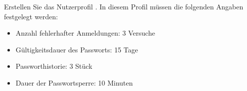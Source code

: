     \item Erstellen Sie das Nutzerprofil . In diesem Profil m\"ussen die folgenden Angaben festgelegt werden:
      \begin{itemize}
        \item Anzahl fehlerhafter Anmeldungen: 3 Versuche
        \item G\"ultigkeitsdauer des Passworts: 15 Tage
        \item Passworthistorie: 3 St\"uck
        \item Dauer der Passwortsperre: 10 Minuten
      \end{itemize}
